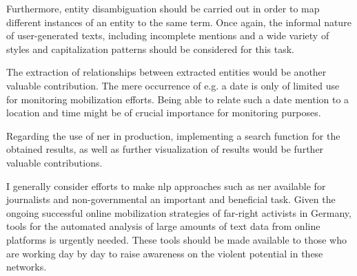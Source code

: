 Furthermore, entity disambiguation should be carried out in order to map different instances of an entity to the same term. Once again, the informal nature of user-generated texts, including incomplete mentions and a wide variety of styles and capitalization patterns should be considered for this task. 

The extraction of relationships between extracted entities would be another valuable contribution. The mere occurrence of e.g. a date is only of limited use for monitoring mobilization efforts. Being able to relate such a date mention to a location and time might be of crucial importance for monitoring purposes. 

Regarding the use of \gls{ner} in production, implementing a search function for the obtained results, as well as further visualization of results would be further valuable contributions.

I generally consider efforts to make \gls{nlp} approaches such as \gls{ner} available for journalists and non-governmental an important and beneficial task. Given the ongoing successful online mobilization strategies of far-right activists in Germany, tools for the automated analysis of large amounts of text data from online platforms is urgently needed. These tools should be made available to those who are working day by day to raise awareness on the violent potential in these networks.
